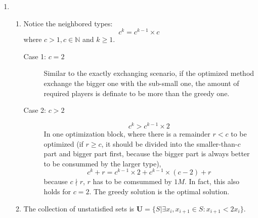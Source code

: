 \documentclass[12pt,a4paper]{article}
\makeatletter
\newtheorem*{solution}{Solution}
\theoremstyle{definition}
\renewenvironment{solution}[1][Solution] {\par\pushQED{\qed}\normalfont\topsep6\p@\@plus6\p@\relax\trivlist\item[\hskip\labelsep\bfseries#1\@addpunct{.}]\ignorespaces}{\popQED\endtrivlist\@endpefalse} \makeatother
\makeatother
\begin{document}
\begin{enumerate}
\begin{solution}
\begin{enumerate}
\begin{description}
		   \end{description}
		   
		   So the greedy algorithm is the best solution.

		   \item Notice the neighbored types:
		   \begin{equation*}
			   c^k = c^{k-1}\times c
		   \end{equation*}
		   where $c>1, c\in \mathbb{N}$ and $k\geq 1$.
		   \begin{description}
			   \item[Case 1: $c=2$] Similar to the exactly exchanging scenario, if the optimized method exchange the bigger one with the sub-small one, the amount of required players is definate to be more than the greedy one.
			   \item[Case 2: $c>2$] 
			   \begin{equation*}
				   c^k > c^{k-1} \times 2
			   \end{equation*}
			   In one optimization block, where there is a remainder $r<c$ to be optimized (if $r\geq c$, it should be divided into the smaller-than-$c$ part and bigger part first, because the bigger part is always better to be consummed by the larger type), 
			   \begin{equation*}
				   c^k + r = c^{k-1}\times 2 + c^{k-1}\times (c-2) + r
			   \end{equation*}
			   because $c\nmid r$, $r$ has to be comsummed by $1M$. In fact, this also holds for $c=2$. The greedy solution is the optimal solution.
		   \end{description}
		   \item The collection of unstatisfied sets is $\mathbf{U}=\{S|\exists x_i,x_{i+1}\in S:x_{i+1}<2x_{i}\}$.
		   

\end{enumerate}
\end{solution}
\end{enumerate}
\end{document}
